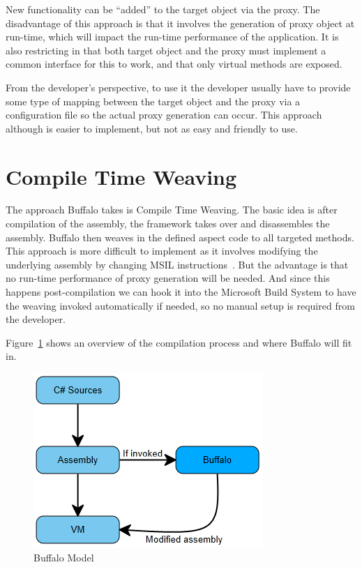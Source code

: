 New functionality can be “added” to the target object via the proxy. The disadvantage of this approach is that it involves the generation of proxy object at run-time, which will impact the run-time performance of the application. It is also restricting in that both target object and the proxy must implement a common interface for this to work, and that only virtual methods are exposed.

From the developer's perspective, to use it the developer usually have to provide some type of mapping between the target object and the proxy via a configuration file so the actual proxy generation can occur. This approach although is easier to implement, but not as easy and friendly to use.

\section{Compile Time Weaving}

The approach Buffalo takes is Compile Time Weaving. The basic idea is after compilation of the assembly, the framework takes over and disassembles the assembly. Buffalo then weaves in the defined aspect code to all targeted methods. This approach is more difficult to implement as it involves modifying the underlying assembly by changing MSIL instructions~\cite{rewrite_msil}. But the advantage is that no run-time performance of proxy generation will be needed. And since this happens post-compilation we can hook it into the Microsoft Build System to have the weaving invoked automatically if needed, so no manual setup is required from the developer.

Figure~\ref{buffalo_model} shows an overview of the compilation process and where Buffalo will fit in.

\begin{figure}[H]
  \includegraphics[scale=1.0]{BuffaloOverview.PNG}
  \centering
  \caption{Buffalo Model\label{buffalo_model}}
\end{figure}

